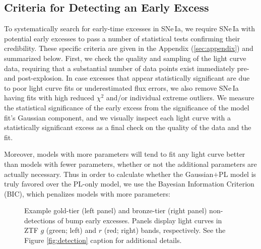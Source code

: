 \documentclass[twocolumn,twocolappendix, linenumbers]{aastex631} %
\begin{document}
\subsection{Criteria for Detecting an Early Excess} \label{sec:tiers}
To systematically search for early-time excesses in SNe\,Ia, we require SNe\,Ia with potential early excesses to pass a number of statistical tests confirming their credibility. These specific criteria are given in the Appendix (\ref{sec:appendix}) and summarized below.  First, we check the quality and sampling of the light curve data, requiring that a substantial number of data points exist immediately pre- and post-explosion. In case excesses that appear statistically significant are due to poor light curve fits or underestimated flux errors, we also remove SNe\,Ia having fits with high reduced $\chi^2$ and/or individual extreme outliers. We measure the statistical significance of the early excess from the significance of the model fit's Gaussian component, and we visually inspect each light curve with a statistically significant excess as a final check on the quality of the data and the fit.

Moreover, models with more parameters will tend to fit any light curve better than models with fewer parameters, whether or not the additional parameters are actually necessary. Thus in order to calculate whether the Gaussian$+$PL model is truly favored over the PL-only model, we use the Bayesian Information Criterion (BIC), which penalizes models with more parameters:

\begin{figure}
     \centering
     \hfill
        \caption{Example gold-tier (left panel) and bronze-tier (right panel) non-detections of bump early excesses. Panels display light curves in ZTF $g$ (green; left) and $r$ (red; right) bands, respectively. 
        See the Figure \ref{fig:detection} caption for additional details.}
        \label{fig:nondetection}
\end{figure}
\end{document}
